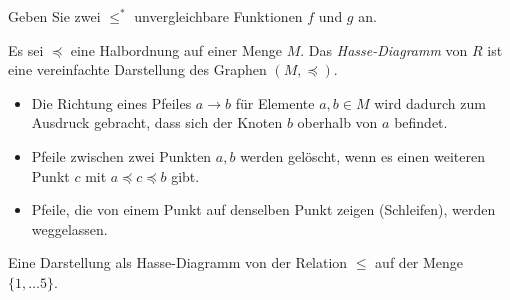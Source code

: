     \begin{ueb}
        Geben Sie zwei $\leq^*$ unvergleichbare Funktionen $f$ und $g$ an.
    \end{ueb}
    \begin{lsg}
    \end{lsg}

    \begin{df}
    Es sei $\preceq$ eine Halbordnung auf einer Menge $M$. Das \textit{Hasse-Diagramm} von $R$ ist eine vereinfachte Darstellung des Graphen $(M,\preceq)$.
    \begin{itemize}
    \item Die Richtung eines Pfeiles $a\to b$ für Elemente $a,b\in M$ wird dadurch zum Ausdruck gebracht, dass sich der Knoten $b$ oberhalb von $a$ befindet.
    \item Pfeile zwischen zwei Punkten $a,b$ werden gelöscht, wenn es einen weiteren Punkt $c$ mit $a\preceq c\preceq b$ gibt.
    \item Pfeile, die von einem Punkt auf denselben Punkt zeigen (Schleifen), werden weggelassen.
    \end{itemize}
    \end{df}

    \begin{bsp}
    Eine Darstellung als Hasse-Diagramm von der Relation $\leq$ auf der Menge $\{1,\dots 5\}$.
    \begin{center}
    \end{center}
    \end{bsp}

